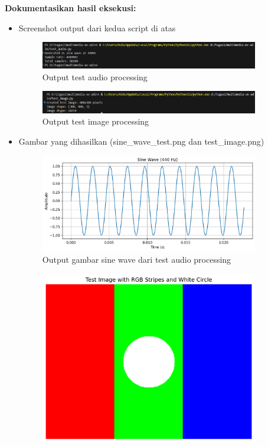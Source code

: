 \documentclass[11pt,a4paper]{article}
\begin{document}
\textbf{Dokumentasikan hasil eksekusi:}
\begin{itemize}
    \item Screenshot output dari kedua script di atas
        \begin{figure}[H]
            \centering
            \includegraphics[width=0.9\textwidth]{image/ss_test_audio.png}
            \caption{Output test audio processing}
            \label{fig:test-audio}
        \end{figure}
        \begin{figure}[H]
            \centering
            \includegraphics[width=0.9\textwidth]{image/ss_test_image.png}
            \caption{Output test image processing}
            \label{fig:test-audio}
        \end{figure}
    \item Gambar yang dihasilkan (sine\_wave\_test.png dan test\_image.png)
        \begin{figure}[H]
            \centering
            \includegraphics[width=0.9\textwidth]{image/sine_wave_test.png}
            \caption{Output gambar sine wave dari test audio processing}
            \label{fig:test-audio}
        \end{figure}
        \begin{figure}[H]
            \centering
            \includegraphics[width=0.9\textwidth]{image/test_image.png}

\end{figure}
\end{itemize}
\end{document}

